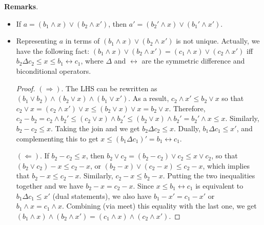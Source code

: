 \documentclass[12pt]{article}
\begin{document}
\textbf{Remarks}.  
\begin{itemize}
\item
If $a=(b_1\wedge x)\vee (b_2\wedge x')$, then $a'=(b_2'\wedge x)\vee (b_1'\wedge x')$.
\item
Representing $a$ in terms of $(b_1\wedge x)\vee (b_2\wedge x')$ is not unique.  Actually, we have the following fact: $(b_1\wedge x)\vee (b_2\wedge x')=(c_1\wedge x)\vee (c_2\wedge x')$ iff $b_2\Delta c_2\le x\le b_1\leftrightarrow c_1$, where $\Delta$ and $\leftrightarrow$ are the symmetric difference and biconditional operators.
\begin{proof} $(\Rightarrow)$.  The LHS can be rewritten as $(b_1\vee b_2)\wedge (b_2\vee x)\wedge (b_1\vee x')$.  As a result, $c_2\wedge x'\le b_2\vee x$ so that $c_2\vee x=(c_2\wedge x')\vee x\le (b_2\vee x)\vee x=b_2\vee x$.  Therefore, $c_2-b_2 = c_2\wedge b_2' \le (c_2\vee x)\wedge b_2' \le (b_2\vee x)\wedge b_2' = b_2'\wedge x \le x$.  Similarly, $b_2 -c_2\le x$.  Taking the join and we get $b_2\Delta c_2\le x$.  Dually, $b_1\Delta c_1\le x'$, and complementing this to get $x\le (b_1\Delta c_1)'= b_1\leftrightarrow c_1$.

$(\Leftarrow)$.  If $b_2-c_2\le x$, then $b_2\vee c_2= (b_2-c_2)\vee c_2\le x\vee c_2$, so that $(b_2\vee c_2)-x \le c_2 - x$, or $(b_2-x)\vee (c_2-x)\le c_2-x$, which implies that $b_2-x\le c_2-x$.  Similarly, $c_2-x\le b_2-x$.  Putting the two inequalities together and we have $b_2-x=c_2-x$.  Since $x\le b_1\leftrightarrow c_1$ is equivalent to $b_1\Delta c_1 \le x'$ (dual statements), we also have $b_1-x'=c_1-x'$ or $b_1\wedge x= c_1\wedge x$.  Combining (via meet) this equality with the last one, we get $(b_1\wedge x)\wedge (b_2\wedge x')=(c_1\wedge x)\wedge (c_2\wedge x')$.
\end{proof}
\end{itemize}
\end{document}

